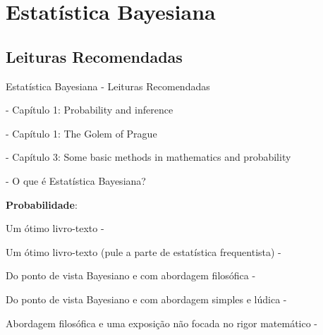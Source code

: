 \section{Estatística Bayesiana}

\subsection{Leituras Recomendadas}
\begin{frame}{Estatística Bayesiana - Leituras Recomendadas}
    \begin{vfilleditems}
        \item \textcite{gelman2013bayesian} - Capítulo 1: Probability and inference
        \item \textcite{mcelreath2020statistical} - Capítulo 1: The Golem of Prague
        \item \textcite{gelman2020regression} - Capítulo 3: Some basic methods in mathematics and probability
        \item \textcite{khanBayesianLearningRule2021}
        \item \textcite{storopoli2021estatisticabayesianaR} - O que é Estatística Bayesiana?
        \item \textbf{Probabilidade}:
        \begin{vfilleditems}
            \item Um ótimo livro-texto - \textcite{bertsekasIntroductionProbability2nd2008}
            \item Um ótimo livro-texto (pule a parte de estatística frequentista) - \textcite{dekkingModernIntroductionProbability2010}
            \item Do ponto de vista Bayesiano e com abordagem filosófica - \textcite{jaynesProbabilityTheoryLogic2003}
            \item Do ponto de vista Bayesiano e com abordagem simples e lúdica - \textcite{kurtBayesianStatisticsFun2019}
            \item Abordagem filosófica e uma exposição não focada no rigor matemático - \textcite{diaconisTenGreatIdeas2019}
        \end{vfilleditems}
    \end{vfilleditems}
\end{frame}

